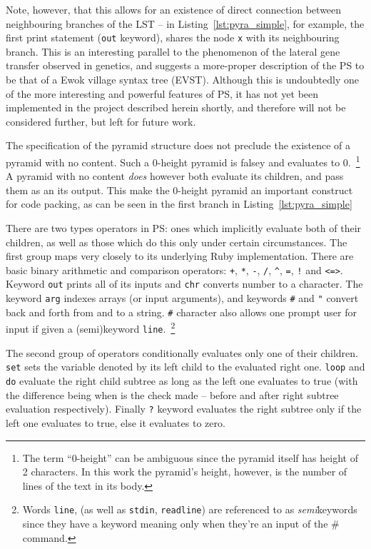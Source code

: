 \documentclass[aip,jcp,reprint,footinbib]{revtex4-1}
\let\tt\texttt
\begin{document}
Note, however, that this allows for an existence of direct connection between neighbouring branches of the LST -- in Listing~\ref{lst:pyra_simple}, for example, the first print statement (\tt{out} keyword), shares the node \tt{x} with its neighbouring branch. This is an interesting parallel to the phenomenon of the lateral gene transfer observed in genetics, and suggests a more-proper description of the PS to be that of a Ewok village syntax tree (EVST).\cite{keeling2008,smbc} Although this is undoubtedly one of the more interesting and powerful features of PS, it has not yet been implemented in the project described herein shortly, and therefore will not be considered further, but left for future work.

The specification of the pyramid structure does not preclude the existence of a pyramid with no content. Such a 0-height pyramid is falsey and evaluates to 0.~\footnote{The term \enquote{0-height} can be ambiguous since the pyramid itself has height of 2 characters. In this work the pyramid's height, however, is the number of lines of the text in its body.}~\cite{psnegation} A pyramid with no content \emph{does} however both evaluate its children, and pass them as an its output. This make the 0-height pyramid an important construct for code packing, as can be seen in the first branch in Listing~\ref{lst:pyra_simple}

There are two types operators in PS: ones which implicitly evaluate both of their children, as well as those which do this only under certain circumstances. The first group maps very closely to its underlying Ruby implementation. There are basic binary arithmetic and comparison operators: \tt{+}, \tt{*}, \tt{-}, \tt{/}, \tt{\^}, \tt{=}, \tt{!} and \tt{<=>}. Keyword \tt{out} prints all of its inputs and \tt{chr} converts number to a character. The keyword \tt{arg} indexes arrays (or input arguments), and keywords \tt{\#} and \tt{"} convert back and forth from and to a string. \tt{\#} character also allows one prompt user for input if given a (semi)keyword \tt{line}.~\footnote{Words \tt{line}, (as well as \tt{stdin}, \tt{readline}) are referenced to as \emph{semi}keywords since they have a keyword meaning only when they're an input of the \# command.}~\cite{pyra_git}

The second group of operators conditionally evaluates only one of their children. \tt{set} sets the variable denoted by its left child to the evaluated right one. \tt{loop} and \tt{do} evaluate the right child subtree as long as the left one evaluates to true (with the difference being when is the check made -- before and after right subtree evaluation respectively). Finally \tt{?} keyword evaluates the right subtree only if the left one evaluates to true, else it evaluates to zero.
\end{document}

